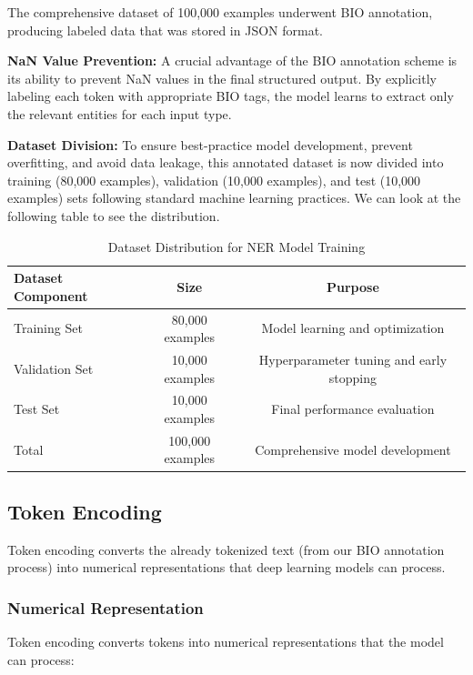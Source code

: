 \documentclass[12pt,a4paper]{article}
\begin{document}
The comprehensive dataset of 100,000 examples underwent BIO annotation, producing labeled data that was stored in JSON format.

\textbf{NaN Value Prevention:}
A crucial advantage of the BIO annotation scheme is its ability to prevent NaN values in the final structured output. By explicitly labeling each token with appropriate BIO tags, the model learns to extract only the relevant entities for each input type.


\textbf{Dataset Division:}
To ensure best-practice model development, prevent overfitting, and avoid data leakage, this annotated dataset is now divided into training (80,000 examples), validation (10,000 examples), and test (10,000 examples) sets following standard machine learning practices. We can look at the following table to see the distribution.

\begin{table}[H]
\centering
\begin{tabular}{|l|c|c|}
\hline
\textbf{Dataset Component} & \textbf{Size} & \textbf{Purpose} \\
\hline
Training Set & 80,000 examples & Model learning and optimization \\
\hline
Validation Set & 10,000 examples & Hyperparameter tuning and early stopping \\
\hline
Test Set & 10,000 examples & Final performance evaluation \\
\hline
Total & 100,000 examples & Comprehensive model development \\
\hline
\end{tabular}
\caption{Dataset Distribution for NER Model Training}
\end{table}

\subsection{Token Encoding}

Token encoding converts the already tokenized text (from our BIO annotation process) into numerical representations that deep learning models can process. 

\subsubsection{Numerical Representation}

Token encoding converts tokens into numerical representations that the model can process:
\end{document}
